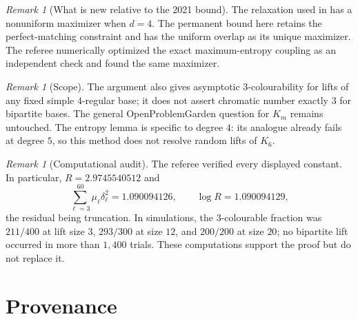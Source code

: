 \documentclass[11pt,a4paper]{article}
\theoremstyle{plain}
\theoremstyle{definition}
\theoremstyle{remark}
\newtheorem{remark}[theorem]{Remark}
\begin{document}
\begin{remark}[What is new relative to the 2021 bound]
The relaxation used in \cite{NPG21} has a nonuniform maximizer when $d=4$.  The
permanent bound here retains the perfect-matching constraint and has the uniform
overlap as its unique maximizer.  The referee numerically optimized the exact
maximum-entropy coupling as an independent check and found the same maximizer.
\end{remark}

\begin{remark}[Scope]
The argument also gives asymptotic $3$-colourability for lifts of any fixed simple
$4$-regular base; it does not assert chromatic number exactly $3$ for bipartite bases.
The general OpenProblemGarden question for $K_m$ remains untouched.  The entropy lemma
is specific to degree $4$: its analogue already fails at degree $5$, so this method
does not resolve random lifts of $K_6$.
\end{remark}

\begin{remark}[Computational audit]
The referee verified every displayed constant.  In particular,
$R=2.9745540512$ and
\[
 \sum_{\ell=3}^{60}\mu_\ell\delta_\ell^2=1.090094126,
 \qquad \log R=1.090094129,
\]
the residual being truncation.  In simulations, the $3$-colourable fraction was
$211/400$ at lift size $3$, $293/300$ at size $12$, and $200/200$ at size $20$;
no bipartite lift occurred in more than $1{,}400$ trials.  These computations support
the proof but do not replace it.
\end{remark}

\section{Provenance}\label{sec:provenance}
\end{document}
